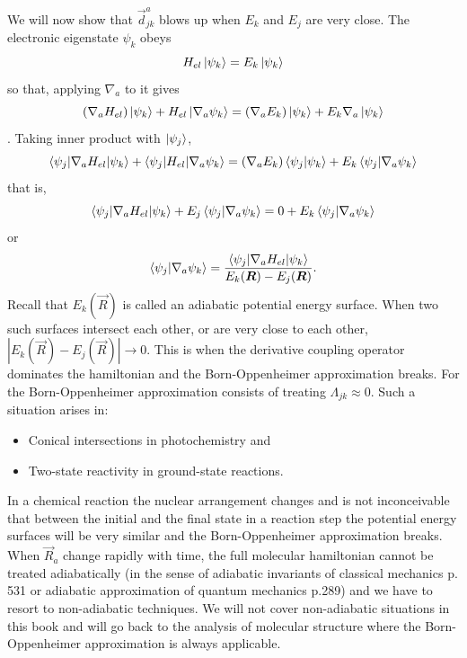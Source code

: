 We will now show that $\vec{d}^a_{jk}$ blows up when $E_k$ and $E_j$ are very 
close. The electronic eigenstate $\psi_k$ obeys
\[
H_{el}\ket{\psi_k} = E_k\ket{\psi_k}
\]
so that, applying $\nabla_a$ to it gives
\[
(\nabla_a H_{el})\ket{\psi_k} + H_{el}\ket{\nabla_a\psi_k} = 
(\nabla_a E_k)\ket{\psi_k} + E_k \nabla_a\ket{\psi_k}
\].
Taking inner product with $\ket{\psi_j}$,
\[
\braket{\psi_j|\nabla_a H_{el}|\psi_k} + \braket{\psi_j|H_{el}|\nabla_a\psi_k}
= (\nabla_a E_k)\braket{\psi_j|\psi_k} + E_k\braket{\psi_j|\nabla_a\psi_k}
\]
that is,
\[
\braket{\psi_j|\nabla_a H_{el}|\psi_k} + E_j\braket{\psi_j|\nabla_a\psi_k} = 
0 + E_k\braket{\psi_j|\nabla_a\psi_k}
\]
or
\begin{equation}\label{c2e33}
\braket{\psi_j|\nabla_a\psi_k} = \frac{\braket{\psi_j|\nabla_a H_{el}|\psi_k}}
{E_k(\bm{R}) - E_j(\bm{R})}.
\end{equation}
Recall that $E_k(\vec{R})$ is called an adiabatic potential energy surface.
When two such surfaces intersect each other, or are very close to each other,
$|E_k(\vec{R}) - E_j(\vec{R})| \rightarrow 0$. This is when the derivative
coupling operator dominates the hamiltonian and the Born-Oppenheimer 
approximation breaks. For the Born-Oppenheimer approximation consists of 
treating $\Lambda_{jk} \approx 0$. Such a situation arises in:
\begin{itemize}
\item Conical intersections in photochemistry and
\item Two-state reactivity in ground-state reactions.
\end{itemize}
In a chemical reaction the nuclear arrangement changes and is not inconceivable
that between the initial and the final state in a reaction step the potential
energy surfaces will be very similar and the Born-Oppenheimer approximation
breaks. When $\vec{R}_a$ change rapidly with time, the full molecular 
hamiltonian cannot be treated adiabatically (in the sense of adiabatic 
invariants of classical mechanics \cite{goldstein} p. 531 or adiabatic 
approximation of quantum mechanics \cite{schiff} p.289) and we have to resort 
to non-adiabatic techniques. We will not cover non-adiabatic situations in this
book and will go back to the analysis of molecular structure where the
Born-Oppenheimer approximation is always applicable.

